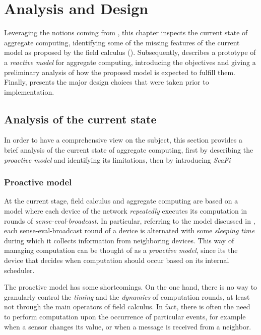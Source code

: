 \chapter{Analysis and Design}
\label{chap:analysis-design}

Leveraging the notions coming from , this chapter inspects the current state of aggregate computing, identifying some of the missing features of the current model as proposed by the field calculus ().
%
Subsequently,  describes a prototype of a \textit{reactive model} for aggregate computing, introducing the objectives and giving a preliminary analysis of how the proposed model is expected to fulfill them.
%
Finally,  presents the major design choices that were taken prior to implementation.

\section{Analysis of the current state}
\label{sec:current-state}

In order to have a comprehensive view on the subject, this section provides a brief analysis of the current state of aggregate computing, first by describing the \textit{proactive model} and identifying its limitations, then by introducing \textit{ScaFi}

\subsection{Proactive model}

At the current stage, field calculus and aggregate computing are based on a model where each device of the network \textit{repeatedly} executes its computation in rounds of \textit{sense-eval-broadcast}.
%
In particular, referring to the model discussed in \cite{10.1145/3177774}, each sense-eval-broadcast round of a device is alternated with some \textit{sleeping time} during which it collects information from neighboring devices.
%
This way of managing computation can be thought of as a \textit{proactive model}, since its the device that decides when computation should occur based on its internal scheduler.

The proactive model has some shortcomings.
%
On the one hand, there is no way to granularly control the \textit{timing} and the \textit{dynamics} of computation rounds, at least not through the main operators of field calculus.
%
In fact, there is often the need to perform computation upon the occurrence of particular events, for example when a sensor changes its value, or when a message is received from a neighbor.

